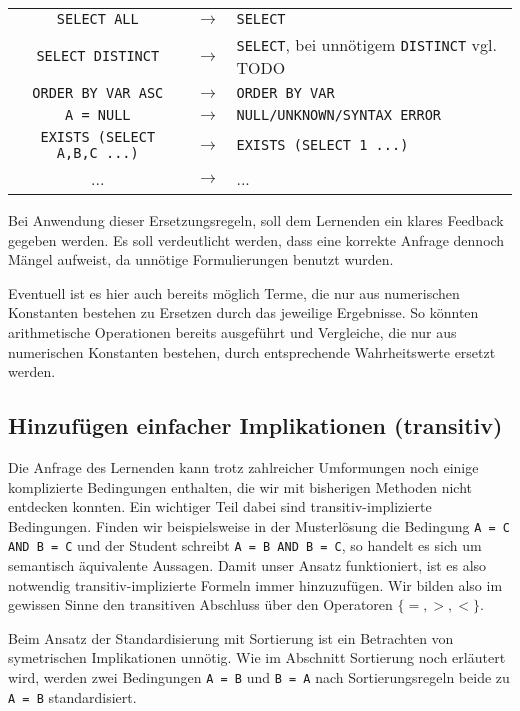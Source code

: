 \begin{tabular}{ccl}
\verb|SELECT ALL| & $\to$ & \verb|SELECT|\\
\verb|SELECT DISTINCT| & $\to$ & \verb|SELECT|, bei unnötigem \verb|DISTINCT| vgl. TODO\\
\verb|ORDER BY VAR ASC| &  $\to$ & \verb|ORDER BY VAR|\\
\verb|A = NULL| & $\to$ & \verb|NULL/UNKNOWN/SYNTAX ERROR|\\
\verb|EXISTS (SELECT A,B,C ...)| & $\to$ & \verb|EXISTS (SELECT 1 ...)|\\
... & $\to$ & ...\\
\end{tabular}

Bei Anwendung dieser Ersetzungsregeln, soll dem Lernenden ein klares Feedback gegeben werden. Es soll verdeutlicht werden, dass eine korrekte Anfrage dennoch Mängel aufweist, da unnötige Formulierungen benutzt wurden.

Eventuell ist es hier auch bereits möglich Terme, die nur aus numerischen Konstanten bestehen zu Ersetzen durch das jeweilige Ergebnisse. So könnten arithmetische Operationen bereits ausgeführt und Vergleiche, die nur aus numerischen Konstanten bestehen, durch entsprechende Wahrheitswerte ersetzt werden.



\subsection{Hinzufügen einfacher Implikationen (transitiv)}

Die Anfrage des Lernenden kann trotz zahlreicher Umformungen noch einige komplizierte Bedingungen enthalten, die wir mit bisherigen Methoden nicht entdecken konnten. Ein wichtiger Teil dabei sind transitiv-implizierte Bedingungen. Finden wir beispielsweise in der Musterlösung die Bedingung \verb|A = C AND B = C| und der Student schreibt \verb|A = B AND B = C|, so handelt es sich um semantisch äquivalente Aussagen. Damit unser Ansatz funktioniert, ist es also notwendig transitiv-implizierte Formeln immer hinzuzufügen. Wir bilden also im gewissen Sinne den transitiven Abschluss über den Operatoren $\{=,>,<\}$.

Beim Ansatz der Standardisierung mit Sortierung ist ein Betrachten von symetrischen Implikationen unnötig. Wie im Abschnitt Sortierung noch erläutert wird, werden zwei Bedingungen \verb|A = B| und \verb|B = A| nach Sortierungsregeln beide zu \verb|A = B| standardisiert. 

